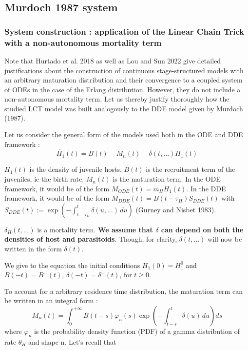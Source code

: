\documentclass[12pt,a4paper,onecolumn]{article}
\begin{document}
\subsection{Murdoch 1987 system}
\subsubsection{System construction : application of the Linear Chain Trick with a non-autonomous mortality term}
Note that Hurtado et al. 2018 as well as Lou and Sun 2022 give detailed justifications about the construction of continuous stage-structured models with an arbitrary maturation distribution and their convergence to a coupled system of ODEs in the case of the Erlang distribution. However, they do not include a non-autonomous mortality term. Let us thereby justify thoroughly how the studied LCT model was built analogously to the DDE model given by Murdoch (1987).

Let us consider the general form of the models used both in the ODE and DDE framework :  
\begin{equation}
\dot{H_{1}}(t) = B(t) - M_n(t) - \delta(t, ...) H_1(t)
\end{equation}

$H_1(t)$ is the density of juvenile hosts. $B(t)$ is the recruitment term of the juveniles, ie the birth rate. $M_n(t)$ is the maturation term. In the ODE framework, it would be of the form $M_{ODE}(t)= m_H H_1(t)$. In the DDE framework, it would be of the form $M_{DDE}(t) = B(t-\tau_H)S_{DDE}(t)$ with $S_{DDE}(t) := \exp\left( -\int_{t-\tau_H}^{t} \delta(u, ...) \, du \right)$ (Gurney and Nisbet 1983). 

$\delta_H(t, ...)$ is a mortality term. \textbf{We assume that $\delta$ can depend on both the densities of host and parasitoids}. Though, for clarity, $\delta(t, ...)$ will now be written in the form $\delta(t)$.

We give to the equation the initial conditions $H_1(0) = H_1^0$ and $B(-t) = B^{-}(t)$, $\delta(-t) = \delta^{-}(t)$, for $t \geq 0$.

To account for a arbitrary residence time distribution, the maturation term can be written in an integral form :
\begin{equation}
M_n(t) = \int_0^{+\infty} B(t-s)\varphi_n(s) \exp\left( -\int_{t-s}^{t} \delta(u) \, du \right) ds
\end{equation}
where $\varphi_n$ is the probability density function (PDF) of a gamma distribution of rate $\theta_H$ and shape n. Let's recall that
\end{document}
